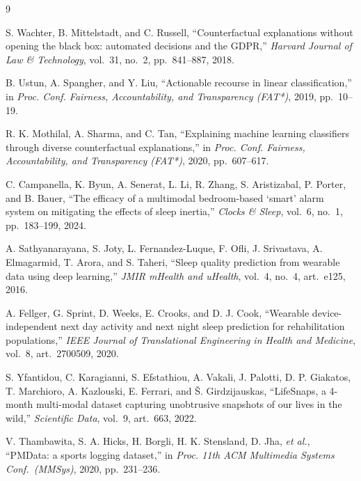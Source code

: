 \documentclass[conference,letterpaper]{IEEEtran}
\begin{document}
\begin{thebibliography}{9}

S. Wachter, B. Mittelstadt, and C. Russell, ``Counterfactual explanations
without opening the black box: automated decisions and the GDPR,''
\emph{Harvard Journal of Law \& Technology}, vol.~31, no.~2, pp.~841--887, 2018.

B. Ustun, A. Spangher, and Y. Liu, ``Actionable recourse in linear
classification,'' in \emph{Proc. Conf. Fairness, Accountability, and
Transparency (FAT*)}, 2019, pp.~10--19.

R. K. Mothilal, A. Sharma, and C. Tan, ``Explaining machine learning classifiers
through diverse counterfactual explanations,'' in \emph{Proc. Conf. Fairness,
Accountability, and Transparency (FAT*)}, 2020, pp.~607--617.

C. Campanella, K. Byun, A. Senerat, L. Li, R. Zhang, S. Aristizabal, P. Porter,
and B. Bauer, ``The efficacy of a multimodal bedroom-based `smart' alarm system
on mitigating the effects of sleep inertia,'' \emph{Clocks \& Sleep}, vol.~6,
no.~1, pp.~183--199, 2024.

A. Sathyanarayana, S. Joty, L. Fernandez-Luque, F. Ofli, J. Srivastava,
A. Elmagarmid, T. Arora, and S. Taheri, ``Sleep quality prediction from wearable
data using deep learning,'' \emph{JMIR mHealth and uHealth}, vol.~4, no.~4,
art.~e125, 2016.

A. Fellger, G. Sprint, D. Weeks, E. Crooks, and D. J. Cook, ``Wearable
device-independent next day activity and next night sleep prediction for
rehabilitation populations,'' \emph{IEEE Journal of Translational Engineering in
Health and Medicine}, vol.~8, art.~2700509, 2020.

S. Yfantidou, C. Karagianni, S. Efstathiou, A. Vakali, J. Palotti, D. P.
Giakatos, T. Marchioro, A. Kazlouski, E. Ferrari, and
\v{S}. Girdzijauskas, ``LifeSnaps, a 4-month multi-modal dataset capturing
unobtrusive snapshots of our lives in the wild,'' \emph{Scientific Data},
vol.~9, art.~663, 2022.

V. Thambawita, S. A. Hicks, H. Borgli, H. K. Stensland, D. Jha, \emph{et al.},
``PMData: a sports logging dataset,'' in \emph{Proc. 11th ACM Multimedia Systems
Conf.\ (MMSys)}, 2020, pp.~231--236.

\end{thebibliography}
\end{document}

